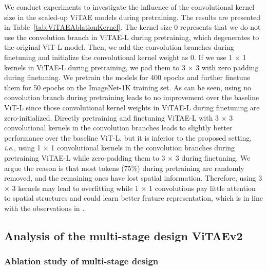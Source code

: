 \documentclass[twocolumn]{svjour3}          \smartqed  \usepackage{natbib}
\newcommand{\ie}{i.e}
\def\onedot{.\xspace}
\def\ie{\emph{i.e}\onedot}
\begin{document}
We conduct experiments to investigate the influence of the convolutional kernel size in the scaled-up ViTAE models during pretraining. The results are presented in Table~\ref{tab:ViTAEAblationKernel}. The kernel size 0 represents that we do not use the convolution branch in ViTAE-L during pretraining, which degenerates to the original ViT-L model. Then, we add the convolution branches during finetuning and initialize the convolutional kernel weight as 0. If we use 1 $\times$ 1 kernels in ViTAE-L during pretraining, we pad them to 3 $\times$ 3 with zero padding during finetuning. We pretrain the models for 400 epochs and further finetune them for 50 epochs on the ImageNet-1K training set. As can be seen, using no convolution branch during pretraining leads to no improvement over the baseline ViT-L since those convolutional kernel weights in ViTAE-L during finetuning are zero-initialized. Directly pretraining and finetuning ViTAE-L with 3 $\times$ 3 convolutional kernels in the convolution branches leads to slightly better performance over the baseline ViT-L, but it is inferior to the proposed setting, \ie, using 1 $\times$ 1 convolutional kernels in the convolution branches during pretraining ViTAE-L while zero-padding them to 3 $\times$ 3 during finetuning. We argue the reason is that most tokens (75\%) during pretraining are randomly removed, and the remaining ones have lost spatial information. Therefore, using 3 $\times$ 3 kernels may lead to overfitting while 1 $\times$ 1 convolutions pay little attention to spatial structures and could learn better feature representation, which is in line with the observations in \citep{zhang2018fully}.

\subsection{Analysis of the multi-stage design ViTAEv2}
\subsubsection{Ablation study of multi-stage design}
\label{Stage-wise ViTAE design}
\end{document}
